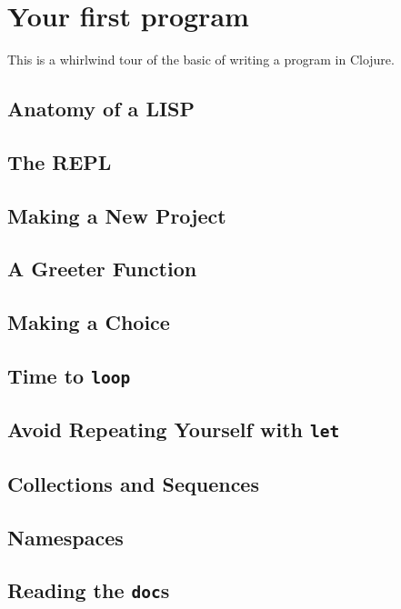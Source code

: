 \chapter{Your first program}

This is a whirlwind tour of the basic of writing a program in Clojure.

\section{Anatomy of a LISP}

\section{The REPL}

\section{Making a New Project}

\section{A Greeter Function}

\section{Making a Choice}

\section{Time to {\tt loop}}

\section{Avoid Repeating Yourself with {\tt let}}

\section{Collections and Sequences}

\section{Namespaces}

\section{Reading the {\tt doc}s}

